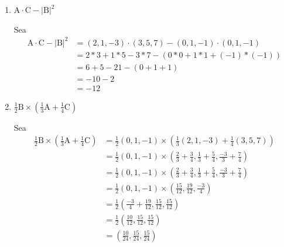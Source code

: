\begin{problema}
\begin{enumerate}
    
    \item $\mathrm{A} \cdot \mathrm{C}-|\mathrm{B}|^{2}$
    \begin{sol}
        Sea
        \begin{align*}
            \mathrm{A} \cdot \mathrm{C}-|\mathrm{B}|^{2}  &= (2,1,-3)\cdot(3,5,7)-(0,1,-1)\cdot(0,1,-1)\\
            &= 2*3+1*5-3*7 - (0*0+1*1+(-1)*(-1))\\
            &= 6+5-21-(0+1+1)\\
            &= -10-2\\
            &= -12
        \end{align*}
    \end{sol}

    \item $\frac{1}{2} \mathrm{B} \times\left(\frac{1}{3} \mathrm{A}+\frac{1}{4} \mathrm{C}\right)$
    \begin{sol}
        Sea
        \begin{align*}
            \frac{1}{2} \mathrm{B} \times\left(\frac{1}{3} \mathrm{A}+\frac{1}{4} \mathrm{C}\right)  &= \frac{1}{2}\left(0,1,-1\right)\times \left(\frac{1}{3} (2,1,-3)+\frac{1}{4}(3,5,7)\right)\\
            &= \frac{1}{2}\left(0,1,-1\right)\times \left(\frac{2}{3}+\frac{3}{4},\frac{1}{3}+\frac{5}{4},\frac{-3}{3}+\frac{7}{4}\right)\\
            &= \frac{1}{2}\left(0,1,-1\right)\times \left(\frac{2}{3}+\frac{3}{4},\frac{1}{3}+\frac{5}{4},\frac{-3}{3}+\frac{7}{4}\right)\\
            &= \frac{1}{2}\left(0,1,-1\right)\times \left(\frac{15}{12},\frac{19}{12},\frac{-3}{4}\right)\\
            &= \frac{1}{2}\left(\frac{-3}{4}+\frac{19}{12},\frac{15}{12},\frac{15}{12}\right)\\
            &= \frac{1}{2}\left(\frac{10}{12},\frac{15}{12},\frac{15}{12}\right)\\
            &= \left(\frac{10}{24},\frac{15}{24},\frac{15}{24}\right)\\
        \end{align*}
    \end{sol}
\end{enumerate}

\end{problema}

